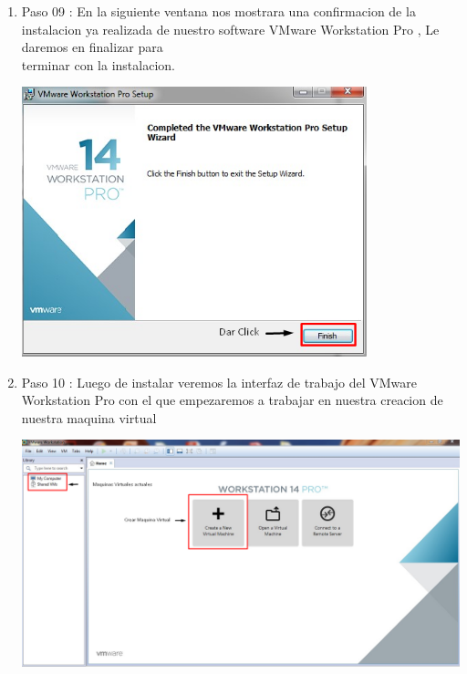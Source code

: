 \begin{enumerate}[1.]
	\hfill \break
	\hfill \break
	\hfill \break
	\hfill \break
	\hfill \break
	\hfill \break
	\hfill \break
	\hfill \break

	\item Paso 09 : En la siguiente ventana nos mostrara una confirmacion de la instalacion ya realizada de nuestro software VMware Workstation Pro , Le daremos en finalizar para             		\\terminar con la instalacion.

	\begin{center}
	\includegraphics[width=10cm]{./Imagenes/ang9} 
	\end{center}

	\hfill \break
	
	

	\item Paso 10 : Luego de instalar veremos la interfaz de trabajo del VMware Workstation Pro con el que empezaremos a trabajar en nuestra creacion de nuestra maquina virtual

	\begin{center}
	\includegraphics[width=16cm]{./Imagenes/ang10} 
	\end{center}


\end{enumerate} 
